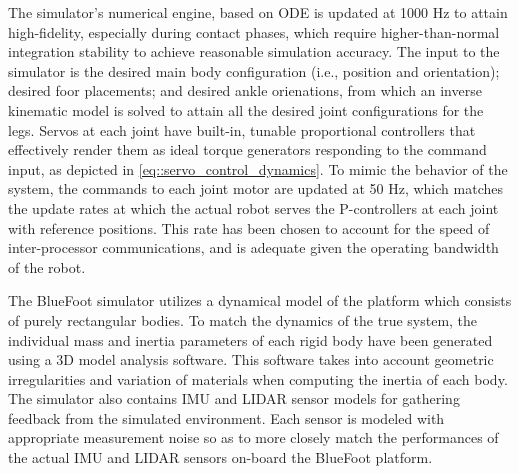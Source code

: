 		The simulator's numerical engine, based on ODE is updated at 1000 Hz to attain high-fidelity, especially during contact phases, which require higher-than-normal integration stability to achieve reasonable  simulation accuracy. The input to the simulator is the desired main body configuration (i.e., position and orientation); desired foor placements; and desired ankle orienations, from which an inverse kinematic model is solved to attain all the desired joint configurations for the legs. Servos at each joint have built-in, tunable proportional controllers that effectively render them as ideal torque generators responding to the command input, as depicted in \ref{eq::servo_control_dynamics}. To mimic the behavior of the system, the commands to each joint motor are updated at 50 Hz, which matches the update rates at which the actual robot serves the P-controllers at each joint with reference positions. This rate has been chosen to account for the speed of inter-processor communications, and is adequate given the operating bandwidth of the robot.
		
		The BlueFoot simulator utilizes a dynamical model of the platform which consists of purely rectangular bodies. To match the dynamics of the true system, the individual mass and inertia parameters of each rigid body have been generated using a 3D model analysis software. This software takes into account geometric irregularities and variation of materials when computing the inertia of each body. The simulator also contains IMU and LIDAR sensor models for gathering feedback from the simulated environment. Each sensor is modeled with appropriate measurement noise so as to more closely match the performances of the actual IMU and LIDAR sensors on-board the BlueFoot platform.

